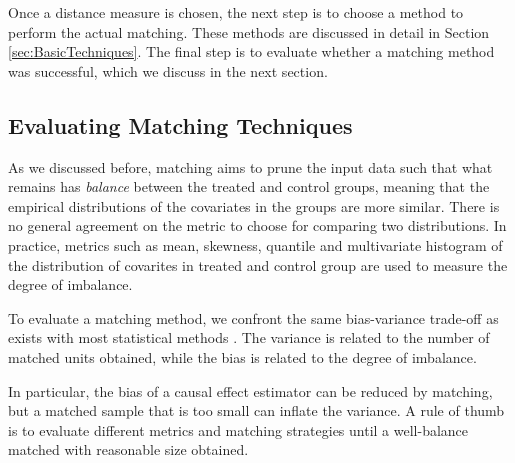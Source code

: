 {{ \vspace{0.3cm}}




Once a distance measure is chosen, the next step is to choose a method to perform the actual matching.  These methods are discussed in detail in Section \ref{sec:BasicTechniques}. The final step is to evaluate whether a matching method was successful, which we discuss in the next section.


\subsection{Evaluating Matching Techniques}

As we discussed before, matching aims to prune the input data such that what remains
has {\em balance} between the treated and control groups, meaning that the empirical distributions
of the covariates in the groups are more similar. There is no general agreement on the metric to choose for comparing two distributions. In practice, metrics such as mean, skewness, quantile and  multivariate histogram of the distribution of covarites in  treated and control group are used to measure the degree of imbalance.

To evaluate a matching method, we confront the same bias-variance trade-off as exists
with most statistical methods \cite{king15}.  The variance is related to  the number of matched units obtained, while  the bias is related to the degree of imbalance.  In particular, the bias of a causal effect estimator can be reduced by matching, but a matched sample that is too small can inflate the variance.
A rule of thumb is to evaluate different metrics and matching strategies until a well-balance matched with reasonable size obtained.

}
